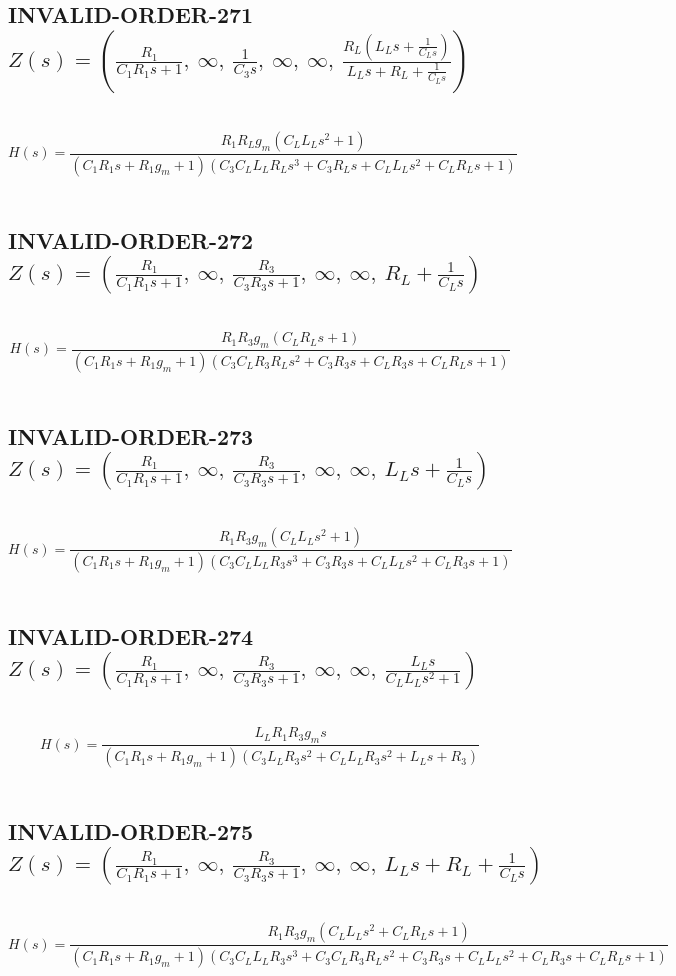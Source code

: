 \documentclass{article}
\begin{document}
\subsection{INVALID-ORDER-271 $Z(s) = \left( \frac{R_{1}}{C_{1} R_{1} s + 1}, \  \infty, \  \frac{1}{C_{3} s}, \  \infty, \  \infty, \  \frac{R_{L} \left(L_{L} s + \frac{1}{C_{L} s}\right)}{L_{L} s + R_{L} + \frac{1}{C_{L} s}}\right)$ } \ 
\textbf{\[H(s) = \frac{R_{1} R_{L} g_{m} \left(C_{L} L_{L} s^{2} + 1\right)}{\left(C_{1} R_{1} s + R_{1} g_{m} + 1\right) \left(C_{3} C_{L} L_{L} R_{L} s^{3} + C_{3} R_{L} s + C_{L} L_{L} s^{2} + C_{L} R_{L} s + 1\right)}\] } \ 
\subsection{INVALID-ORDER-272 $Z(s) = \left( \frac{R_{1}}{C_{1} R_{1} s + 1}, \  \infty, \  \frac{R_{3}}{C_{3} R_{3} s + 1}, \  \infty, \  \infty, \  R_{L} + \frac{1}{C_{L} s}\right)$ } \ 
\textbf{\[H(s) = \frac{R_{1} R_{3} g_{m} \left(C_{L} R_{L} s + 1\right)}{\left(C_{1} R_{1} s + R_{1} g_{m} + 1\right) \left(C_{3} C_{L} R_{3} R_{L} s^{2} + C_{3} R_{3} s + C_{L} R_{3} s + C_{L} R_{L} s + 1\right)}\] } \ 
\subsection{INVALID-ORDER-273 $Z(s) = \left( \frac{R_{1}}{C_{1} R_{1} s + 1}, \  \infty, \  \frac{R_{3}}{C_{3} R_{3} s + 1}, \  \infty, \  \infty, \  L_{L} s + \frac{1}{C_{L} s}\right)$ } \ 
\textbf{\[H(s) = \frac{R_{1} R_{3} g_{m} \left(C_{L} L_{L} s^{2} + 1\right)}{\left(C_{1} R_{1} s + R_{1} g_{m} + 1\right) \left(C_{3} C_{L} L_{L} R_{3} s^{3} + C_{3} R_{3} s + C_{L} L_{L} s^{2} + C_{L} R_{3} s + 1\right)}\] } \ 
\subsection{INVALID-ORDER-274 $Z(s) = \left( \frac{R_{1}}{C_{1} R_{1} s + 1}, \  \infty, \  \frac{R_{3}}{C_{3} R_{3} s + 1}, \  \infty, \  \infty, \  \frac{L_{L} s}{C_{L} L_{L} s^{2} + 1}\right)$ } \ 
\textbf{\[H(s) = \frac{L_{L} R_{1} R_{3} g_{m} s}{\left(C_{1} R_{1} s + R_{1} g_{m} + 1\right) \left(C_{3} L_{L} R_{3} s^{2} + C_{L} L_{L} R_{3} s^{2} + L_{L} s + R_{3}\right)}\] } \ 
\subsection{INVALID-ORDER-275 $Z(s) = \left( \frac{R_{1}}{C_{1} R_{1} s + 1}, \  \infty, \  \frac{R_{3}}{C_{3} R_{3} s + 1}, \  \infty, \  \infty, \  L_{L} s + R_{L} + \frac{1}{C_{L} s}\right)$ } \ 
\textbf{\[H(s) = \frac{R_{1} R_{3} g_{m} \left(C_{L} L_{L} s^{2} + C_{L} R_{L} s + 1\right)}{\left(C_{1} R_{1} s + R_{1} g_{m} + 1\right) \left(C_{3} C_{L} L_{L} R_{3} s^{3} + C_{3} C_{L} R_{3} R_{L} s^{2} + C_{3} R_{3} s + C_{L} L_{L} s^{2} + C_{L} R_{3} s + C_{L} R_{L} s + 1\right)}\] } \ 
\end{document}
